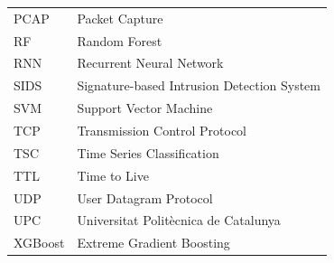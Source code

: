 \begin{longtable}{@{}l l@{}}
PCAP    & Packet Capture \\
RF      & Random Forest \\
RNN     & Recurrent Neural Network \\
SIDS    & Signature-based Intrusion Detection System \\
SVM     & Support Vector Machine \\
TCP     & Transmission Control Protocol \\
TSC     & Time Series Classification \\
TTL     & Time to Live \\
UDP     & User Datagram Protocol \\
UPC     & Universitat Polit\`ecnica de Catalunya \\
XGBoost & Extreme Gradient Boosting \\
\bottomrule
\end{longtable}
